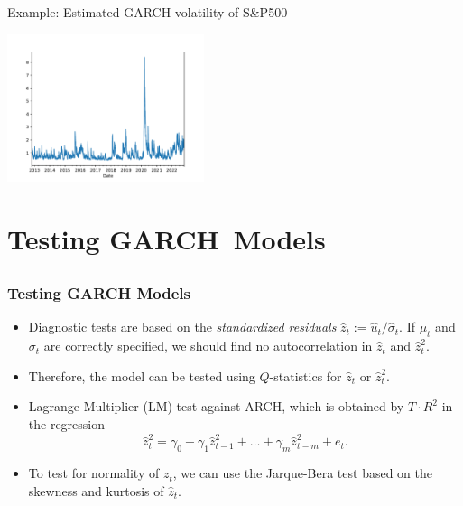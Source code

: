 \begin{frame}%

\begin{block}{Example: Estimated GARCH volatility of S\&P500}
\centerline{\includegraphics[height=1.7in]{sp500sigmas}}
\end{block}

\end{frame}%

\section[Testing]{Testing GARCH\ Models}\subsection*{}
\begin{frame}%

\frametitle{Testing GARCH Models}

\begin{itemize}
\item Diagnostic tests are based on the \emph{\color{red}standardized
residuals} $\hat{z}_{t}:=\hat{u}_{t}/\hat{\sigma}_{t}$. If $\mu _{t}$ and $%
\sigma _{t}$ are correctly specified, we should find no autocorrelation in $%
\hat{z}_{t}$ and $\hat{z}_{t}^{2}$.

\item Therefore, the model can be tested using $Q$-statistics for $\hat{z}%
_{t}$ or $\hat{z}_{t}^{2}$.

\item Lagrange-Multiplier (LM) test against ARCH, which is obtained by $%
T\cdot R^{2}$ in the regression%
\begin{equation*}
\hat{z}_{t}^{2}=\gamma _{0}+\gamma _{1}\hat{z}_{t-1}^{2}+\ldots +\gamma _{m}%
\hat{z}_{t-m}^{2}+e_{t}.
\end{equation*}

\item To test for normality of $z_{t}$, we can use the Jarque-Bera test
based on the skewness and kurtosis of $\hat{z}_{t}$.
\end{itemize}

\end{frame}%

